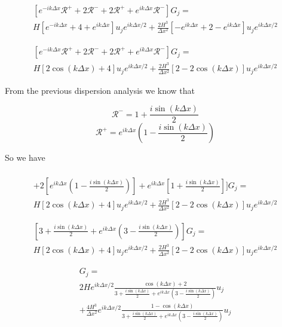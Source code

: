 \documentclass[12pt]{article}
\begin{document}
\begin{multline}
\left[e^{- ik\Delta x} \mathcal{R}^+ +  2 \mathcal{R}^- +  2 \mathcal{R}^+  +  e^{ik\Delta x} \mathcal{R}^-\right] G_j = \\ H\left[e^{- ik\Delta x} + 4 + e^{ ik\Delta x}\right] u_{j}e^{ ik\Delta x/2} +  \frac{2H^3}{\Delta x^2}\left[-e^{ik\Delta x}  + 2 -  e^{ik\Delta x} \right] u_{j}e^{ ik\Delta x/2}
\end{multline}

\begin{multline}
\left[e^{- ik\Delta x} \mathcal{R}^+ +  2 \mathcal{R}^- +  2 \mathcal{R}^+  +  e^{ik\Delta x} \mathcal{R}^-\right] G_j = \\ H\left[2 \cos \left(k\Delta x\right) + 4 \right] u_{j}e^{ ik\Delta x/2} +  \frac{2H^3}{\Delta x^2}\left[ 2 -  2\cos \left(k\Delta x\right) \right] u_{j}e^{ ik\Delta x/2}
\end{multline}

From the previous dispersion analysis we know that 

\[\mathcal{R}^- = 1  + \frac{i\sin\left(k\Delta x\right)}{2}\]
\[\mathcal{R}^+ = e^{ik\Delta x}\left(1  - \frac{i\sin\left(k\Delta x\right)}{2} \right)\]

 So we have 
 
 \begin{multline}
 [\left(1  - \frac{i\sin\left(k\Delta x\right)}{2} \right) +  2 \left[1  + \frac{i\sin\left(k\Delta x\right)}{2}\right] \\+  2 \left[e^{ik\Delta x}\left(1  - \frac{i\sin\left(k\Delta x\right)}{2} \right)\right]  +  e^{ik\Delta x} \left[1  + \frac{i\sin\left(k\Delta x\right)}{2}\right] ] G_j = \\ H\left[2 \cos \left(k\Delta x\right) + 4 \right] u_{j}e^{ ik\Delta x/2} +  \frac{2H^3}{\Delta x^2}\left[ 2 -  2\cos \left(k\Delta x\right) \right] u_{j}e^{ ik\Delta x/2}
 \end{multline}
 
 \begin{multline}
  \left[3   + \frac{i\sin\left(k\Delta x\right)}{2} + e^{ik\Delta x}\left(3   - \frac{i\sin\left(k\Delta x\right)}{2}\right)  \right] G_j = \\ H\left[2 \cos \left(k\Delta x\right) + 4 \right] u_{j}e^{ ik\Delta x/2} +  \frac{2H^3}{\Delta x^2}\left[ 2 -  2\cos \left(k\Delta x\right) \right] u_{j}e^{ ik\Delta x/2}
  \end{multline}

\begin{multline}
G_j = \\ 2H e^{ ik\Delta x/2} \frac{\cos \left(k\Delta x\right) + 2}{3   + \frac{i\sin\left(k\Delta x\right)}{2} + e^{ik\Delta x}\left(3   - \frac{i\sin\left(k\Delta x\right)}{2}\right)} u_{j}  \\+  \frac{4H^3}{\Delta x^2} e^{ ik\Delta x/2}\frac{ 1 -  \cos \left(k\Delta x\right)}{3   + \frac{i\sin\left(k\Delta x\right)}{2} + e^{ik\Delta x}\left(3   - \frac{i\sin\left(k\Delta x\right)}{2}\right)} u_{j}
\end{multline}
\end{document}
